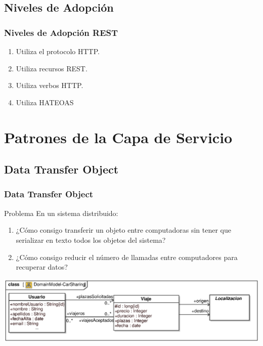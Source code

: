 \documentclass[a4paper,slidestop,xcolor=pst,blue]{beamer}
\begin{document}
\subsection{Niveles de Adopción}

\begin{frame}[c]
    \frametitle{Niveles de Adopción REST}
    \begin{enumerate}[<+->]
        \item Utiliza el protocolo HTTP.
        \item Utiliza recursos REST.
        \item Utiliza verbos HTTP.
        \item Utiliza HATEOAS
    \end{enumerate}
\end{frame}

\section{Patrones de la Capa de Servicio}

\subsection{Data Transfer Object}

\begin{frame}[c]
    \frametitle{Data Transfer Object}
    \begin{block}{Problema}
        En un sistema distribuido:
        \begin{enumerate}
            \item<2-> ¿Cómo consigo transferir un objeto entre computadoras sin tener que serializar en texto todos los objetos del sistema?
            \item<3-> ¿Cómo consigo reducir el número de llamadas entre computadores para recuperar datos?
        \end{enumerate}
    \end{block}
    \begin{center}
        \includegraphics[width=\linewidth]{images/patterns/dto00.eps}
    \end{center}
\end{frame}
\end{document}

